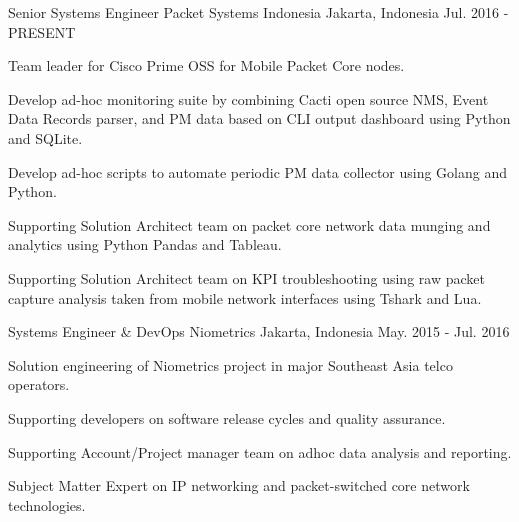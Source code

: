 

\begin{cventries}

  \cventry
    {Senior Systems Engineer} %
    {Packet Systems Indonesia} %
    {Jakarta, Indonesia} %
    {Jul. 2016 - PRESENT} %
    {
      \begin{cvitems} %
        \item {Team leader for Cisco Prime OSS for Mobile Packet Core nodes.}
        \item {Develop ad-hoc monitoring suite by combining Cacti open source NMS, Event Data Records parser, and PM data based on CLI output dashboard using Python and SQLite.}
        \item {Develop ad-hoc scripts to automate periodic PM data collector using Golang and Python.}
        \item {Supporting Solution Architect team on packet core network data munging and analytics using Python Pandas and Tableau.}
        \item {Supporting Solution Architect team on KPI troubleshooting using raw packet capture analysis taken from mobile network interfaces using Tshark and Lua.}
      \end{cvitems}
    }

  \cventry
    {Systems Engineer \& DevOps} %
    {Niometrics} %
    {Jakarta, Indonesia} %
    {May. 2015 - Jul. 2016} %
    {
      \begin{cvitems} %
        \item {Solution engineering of Niometrics project in major Southeast Asia telco operators.}
        \item {Supporting developers on software release cycles and quality assurance.}
        \item {Supporting Account/Project manager team on adhoc data analysis and reporting.}
        \item {Subject Matter Expert on IP networking and packet-switched core network technologies.}
      \end{cvitems}
    }


\end{cventries}
